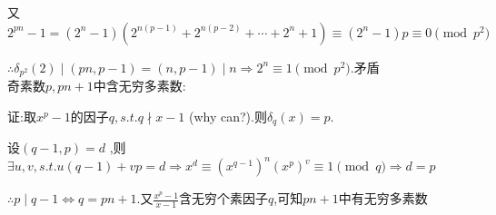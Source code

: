 又$ 2^{pn}-1=(2^n-1)(2^{n(p-1)}+2^{n(p-2)}+\cdots+2^n+1)\equiv(2^n-1)p\equiv 0\pmod{p^2}$

$ \therefore \delta_{p^2}(2)\mid (pn,p-1)=(n,p-1)\mid n\Rightarrow 2^n\equiv 1 \pmod {p^2}$.矛盾
\\

奇素数$ p,{pn+1}$中含无穷多素数:

证:取$ x^p-1$的因子$ q,s.t.q \nmid x-1$ (why can?).则$ \delta_q(x)=p$.

设$ (q-1,p)=d$ ,则$ \exists u,v,s.t.u(q-1)+vp=d\Rightarrow x^d\equiv(x^{q-1})^n(x^p)^v\equiv 1 \pmod q\Rightarrow d=p$ 

$ \therefore p\mid q-1\Leftrightarrow q=pn+1$.又$ \frac{x^p-1}{x-1}$含无穷个素因子$ q$,可知$ {pn+1}$中有无穷多素数
